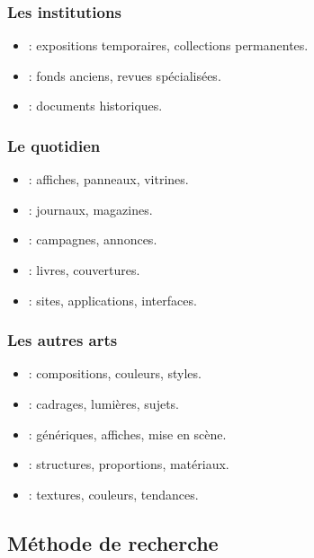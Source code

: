 \subsubsection{Les institutions}

\begin{itemize}
    \item {} : expositions temporaires, collections permanentes.
    \item {} : fonds anciens, revues spécialisées.
    \item {} : documents historiques.
\end{itemize}

\subsubsection{Le quotidien}

\begin{itemize}
    \item {} : affiches, panneaux, vitrines.
    \item {} : journaux, magazines.
    \item {} : campagnes, annonces.
    \item {} : livres, couvertures.
    \item {} : sites, applications, interfaces.
\end{itemize}

\subsubsection{Les autres arts}

\begin{itemize}
    \item {} : compositions, couleurs, styles.
    \item {} : cadrages, lumières, sujets.
    \item {} : génériques, affiches, mise en scène.
    \item {} : structures, proportions, matériaux.
    \item {} : textures, couleurs, tendances.
\end{itemize}

\subsection{Méthode de recherche}

